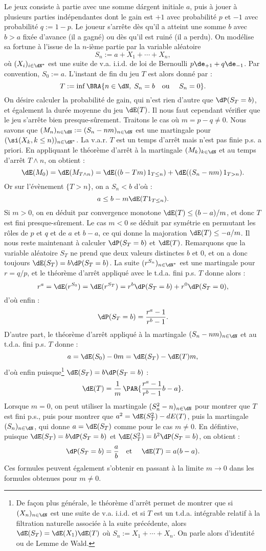 {{Le jeux consiste à partie avec une somme dárgent initiale $a$, puis à
jouer à plusieurs parties indépendantes dont le gain est $+1$ avec
probabilité $p$ et $-1$ avec probabilité $q:=1-p$.  Le joueur s'arrête
dès qu'il a atteint une somme $b$ avec $b>a$ fixée d'avance (il a
gagné) ou dès qu'il est ruiné (il a perdu).  On modélise sa fortune à
l'issue de la $n$-ième partie par la variable aléatoire
$$
S_n:=a+X_1+\cdots+X_n,
$$
où $(X_i)_{i\in\dN^*}$ est une suite de v.a. i.i.d. de loi de
Bernoulli $p\de_{+1}+q\de_{-1}$. Par convention, $S_0:=a$.  L'instant
de fin du jeu $T$ est alors donné par :
$$
T:=\inf\BRA{n\in\dN,\; S_n=b \text{\quad ou \quad} S_n=0}.
$$
On désire calculer la probabilité de gain, qui n'est rien d'autre
que $\dP(S_T=b)$, et également la durée moyenne du jeu $\dE(T)$.  Il
nous faut cependant vérifier que le jeu s'arrête bien
presque-sûrement. Traitons le cas où $m=p-q\neq 0$. Nous savons que
$(M_n)_{n\in\dN}:=(S_n-nm)_{n\in\dN}$ est une martingale pour
$(\si(X_k,k\leq n))_{n\in\dN^*}$.  La v.a.r.  $T$ est un temps d'arrêt
mais n'est pas finie p.s. a priori.  En appliquant le théorème d'arrêt
à la martingale $(M_k)_{k\in\dN}$ et au temps d'arrêt $T\land n$, on
obtient :
$$
\dE(M_0)=\dE(M_{T\land n})
=\dE((b-Tm)\,\mathrm{1}_{T\leq n})+\dE((S_n-nm)\,\mathrm{1}_{T>n}).
$$
Or sur l'évènement $\{T>n\}$, on a $S_n<b$ d'où :
$$
a\leq b-m\dE(T\mathrm{1}_{T\leq n}).
$$
Si $m>0$, on en déduit par convergence monotone $\dE(T)\leq
(b-a)/m$, et donc $T$ est fini presque-sûrement. Le cas $m<0$ se
déduit par symétrie en permutant les rôles de $p$ et $q$ et de $a$ et
$b-a$, ce qui donne la majoration $\dE(T)\leq -a/m$.  Il nous reste
maintenant à calculer $\dP(S_T=b)$ et $\dE(T)$.  Remarquons que la
variable aléatoire $S_T$ ne prend que deux valeurs distinctes $b$ et
$0$, et on a donc toujours $\dE(S_T)=b\dP(S_T=b)$.  La suite
$(r^{S_n})_{n\in\dN^*}$ est une martingale pour $r=q/p$, et le
théorème d'arrêt appliqué avec le t.d.a. fini p.s. $T$ donne alors :
$$
r^a=\dE(r^{S_0})=\dE(r^{S_T})=r^b\dP(S_T=b)+r^0\dP(S_T=0),
$$
d'où enfin :
$$
\dP(S_T=b)=\frac{r^a-1}{r^b-1}.
$$
D'autre part, le théorème d'arrêt appliqué à la martingale 
$(S_n-nm)_{n\in\dN}$ et au t.d.a. fini p.s. $T$ donne :
$$
a=\dE(S_0)-0m=\dE(S_T)-\dE(T)m,
$$
d'où enfin puisque\footnote{De façon plus générale, le théorème
  d'arrêt permet de montrer que si $(X_n)_{n\in\dN}$ est une suite de
  v.a. i.i.d. et si $T$ est un t.d.a. intégrable relatif à la
  filtration naturelle associée à la suite précédente, alors
  $\dE(S_T)=\dE(X_1)\dE(T)$ où $S_n:=X_1+\cdots+X_n$. On parle alors
  d'identité ou de Lemme de Wald.}  $\dE(S_T)=b\dP(S_T=b)$ :
$$
\dE(T)=\frac{1}{m}\,\PAR{\frac{r^a-1}{r^b-1}b-a}.
$$
Lorsque $m=0$, on peut utiliser la martingale $(S_n^2-n)_{n\in\dN}$
pour montrer que $T$ est fini p.s., puis pour montrer que
$a^2=\dE(S_T^2)-dE(T)$, puis la martingale $(S_n)_{n\in\dN}$, qui
donne $a=\dE(S_T)$ comme pour le cas $m\neq 0$. En défintive, puisque
$\dE(S_T)=b\dP(S_T=b)$ et $\dE(S_T^2)=b^2\dP(S_T=b)$, on obtient :
$$
\dP(S_T=b)=\frac{a}{b}
\text{\quad et \quad} 
\dE(T)= a(b-a).
$$
Ces formules peuvent également s'obtenir en passant à la limite
$m\to0$ dans les formules obtenues pour $m\neq 0$.

}}
